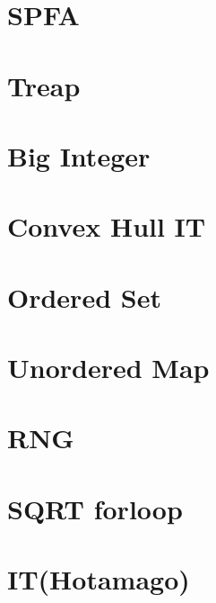 \section{SPFA}
\raggedbottom
\hrulefill

\section{Treap}
\raggedbottom
\hrulefill

\section{Big Integer}
\raggedbottom
\hrulefill

\section{Convex Hull IT}
\raggedbottom
\hrulefill

\section{Ordered Set}
\raggedbottom
\hrulefill

\section{Unordered Map}
\raggedbottom
\hrulefill

\section{RNG}
\raggedbottom
\hrulefill

\section{SQRT forloop}
\raggedbottom
\hrulefill

\section{IT(Hotamago)}
\raggedbottom
\hrulefill

